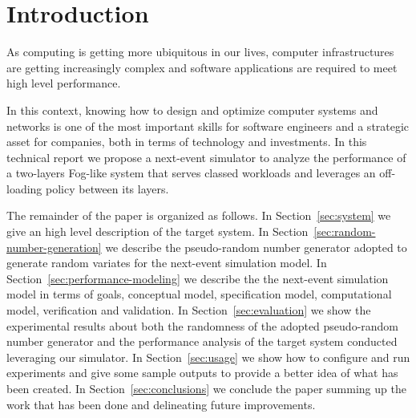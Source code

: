 \section{Introduction}
\label{sec:introduction}


As computing is getting more ubiquitous in our lives, computer infrastructures are getting increasingly complex and software applications are required to meet high level performance.

%
In this context, knowing how to design and optimize computer systems and networks is one of the most important skills for software engineers and a strategic asset for companies, both in terms of technology and investments.
%
In this technical report we propose a next-event simulator to analyze the performance of a two-layers Fog-like system that serves classed workloads and leverages an off-loading policy between its layers.


The remainder of the paper is organized as follows.
%
In Section~\ref{sec:system} we give an high level description of the target system.
%
In Section~\ref{sec:random-number-generation} we describe the pseudo-random number generator adopted to generate random variates for the next-event simulation model.
%
In Section~\ref{sec:performance-modeling} we describe the the next-event simulation model in terms of goals, conceptual model, specification model, computational model, verification and validation.
%
In Section~\ref{sec:evaluation} we show the experimental results about both the randomness of the adopted pseudo-random number generator and the performance analysis of the target system conducted leveraging our simulator.
%
In Section~\ref{sec:usage} we show how to configure and run experiments and give some sample outputs to provide a better idea of what has been created.
%
In Section~\ref{sec:conclusions} we conclude the paper summing up the work that has been done and delineating future improvements.
